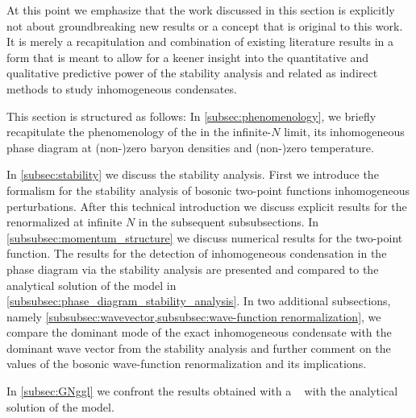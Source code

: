 At this point we emphasize that the work discussed in this section is explicitly not about groundbreaking new results or a concept that is original to this work.
It is merely a recapitulation and combination of existing literature results in a form that is meant to allow for a keener insight into the quantitative and qualitative predictive power of the stability analysis and related \ggla{} as indirect methods to study inhomogeneous condensates.\bigskip

This section is structured as follows: 
In \cref{subsec:phenomenology}, we briefly recapitulate the phenomenology of the \gnm{} in the infinite-$N$ limit, \viz{} its inhomogeneous phase diagram at (non-)zero baryon densities and (non-)zero temperature.

In \cref{subsec:stability} we discuss the stability analysis.
First we introduce the formalism for the stability analysis of bosonic two-point functions \wrt{} inhomogeneous perturbations.
After this technical introduction we discuss explicit results for the renormalized \gnm{} at infinite $N$ in the subsequent subsubsections.
In \cref{subsubsec:momentum_structure} we discuss numerical results for the two-point function.
The results for the detection of inhomogeneous condensation in the phase diagram via the stability analysis are presented and compared to the analytical solution of the model in \cref{subsubsec:phase_diagram_stability_analysis}.
In two additional subsections, namely \cref{subsubsec:wavevector,subsubsec:wave-function renormalization}, we compare the dominant mode of the exact inhomogeneous condensate with the dominant wave vector from the stability analysis and further comment on the values of the bosonic wave-function renormalization and its implications.

In \cref{subsec:GNggl} we confront the results obtained with a \ggla{}~\cite{Abuki:2011pf} with the analytical solution of the model.

